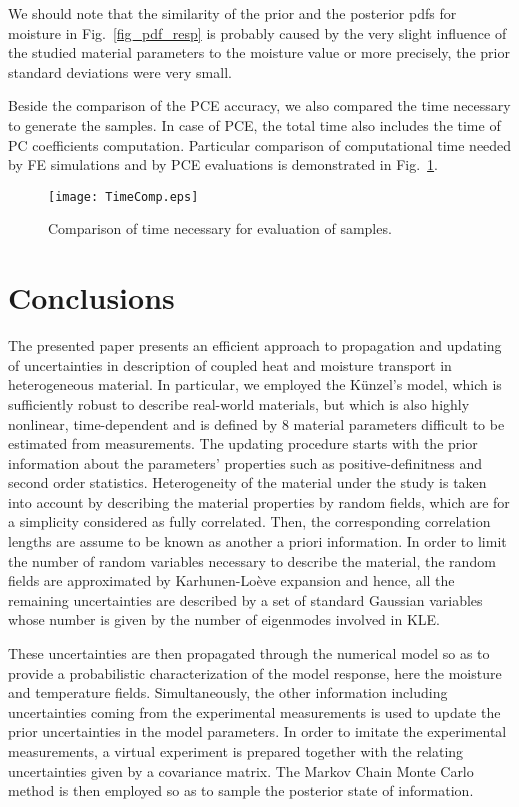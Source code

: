 \documentclass[preprint,12pt]{elsarticle}
\begin{document}
We should note that the similarity of the prior and the posterior
pdfs for moisture in Fig.~\ref{fig_pdf_resp} is probably caused by
the very slight influence of the studied material parameters to
the moisture value or more precisely, the prior standard
deviations were very small.

Beside the comparison of the PCE accuracy, we also compared the time
necessary to generate the samples. In case of PCE, the total time also
includes the time of PC coefficients computation. Particular
comparison of computational time needed by FE simulations and by PCE
evaluations is demonstrated in Fig.~\ref{fig_timecomp}.
\begin{figure} [ht!]
\centering
\texttt{[image: TimeComp.eps]}
\caption{Comparison of time necessary for evaluation of samples.}
\label{fig_timecomp}
\end{figure}

\section{Conclusions}
\label{sec:concl}
The presented paper presents an efficient approach to propagation
and updating of uncertainties in description of coupled heat and
moisture transport in heterogeneous material. In particular, we
employed the K\"unzel's model, which is sufficiently robust to
describe real-world materials, but which is also highly nonlinear,
time-dependent and is defined by $8$ material parameters difficult
to be estimated from measurements. The updating procedure starts
with the prior information about the parameters' properties such
as positive-definitness and second order statistics. Heterogeneity
of the material under the study is taken into account by
describing the material properties by random fields, which are for
a simplicity considered as fully correlated. Then, the
corresponding correlation lengths are assume to be known as
another a priori information. In order to limit the number of
random variables necessary to describe the material, the random
fields are approximated by Karhunen-Lo\`eve expansion and hence,
all the remaining uncertainties are described by a set of standard
Gaussian variables whose number is given by the number of
eigenmodes involved in KLE.

These uncertainties are then propagated through the numerical
model so as to provide a probabilistic characterization of the
model response, here the moisture and temperature fields.
Simultaneously, the other information including uncertainties
coming from the experimental measurements is used to update the
prior uncertainties in the model parameters. In order to imitate
the experimental measurements, a virtual experiment is prepared
together with the relating uncertainties given by a covariance
matrix. The Markov Chain Monte Carlo method is then employed so as
to sample the posterior state of information.
\end{document}
